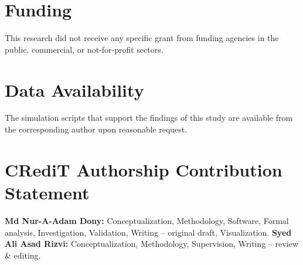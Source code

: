 \documentclass[12pt]{elsarticle}
\theoremstyle{remark}
\begin{document}
\section*{Funding}

This research did not receive any specific grant from funding agencies in the public, commercial, or not-for-profit sectors.

\section*{Data Availability}

The simulation scripts that support the findings of this study are available from the corresponding author upon reasonable request.

\section*{CRediT Authorship Contribution Statement}

\textbf{Md Nur-A-Adam Dony:} Conceptualization, Methodology, Software, Formal analysis, Investigation, Validation, Writing -- original draft, Visualization.
\textbf{Syed Ali Asad Rizvi:} Conceptualization, Methodology, Supervision, Writing -- review \& editing.
\end{document}
